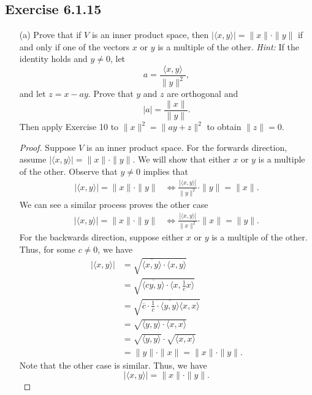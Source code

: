 \subsection*{Exercise 6.1.15} 
\begin{enumerate}
    \item[(a)] Prove that if \( V  \) is an inner product space, then \( | \langle x , y \rangle |  = \| x \| \cdot \| y \| \) if and only if one of the vectors \( x  \) or \( y  \) is a multiple of the other. \textit{Hint:} If the identity holds and \(  y \neq 0  \), let  
        \[  a = \frac{ \langle x , y \rangle }{ \|y\|^{2} },  \]
        and let \( z = x - ay  \). Prove that \( y  \) and \( z  \) are orthogonal and 
        \[  | a  |  = \frac{ \|x\| }{ \|y\| }. \]
        Then apply Exercise 10 to \( \|x\|^{2} = \|ay + z\|^{2} \) to obtain \( \|z\| = 0  \). 
    \begin{proof}
    Suppose \( V  \) is an inner product space. For the forwards direction, assume \( |  \langle  x  , y \rangle |  = \| x \| \cdot \| y\| \). We will show that either \( x  \) or \( y  \) is a multiple of the other. Observe that \( y \neq 0  \) implies that
    \begin{align*}
        | \langle x , y \rangle | = \|x\| \cdot \|y\| &\iff \frac{ | \langle x , y \rangle |  }{ \|y\|^{2} } \cdot \|y\| = \|x\|.  
    \end{align*}
    We can see a similar process proves the other case
    \begin{align*}
        | \langle x , y \rangle | = \|x\| \cdot \|y\| &\iff \frac{ | \langle x , y \rangle |  }{ \|x\|^{2} } \cdot \|x\| = \|y\|.  
    \end{align*}
    For the backwards direction, suppose either \( x  \) or \( y  \) is a multiple of the other. Thus, for some \( c \neq 0  \), we have
    \begin{align*}
        | \langle x , y \rangle |  &= \sqrt{ \overline{\langle x , y \rangle} \cdot \langle x , y \rangle }  \\
                                   &= \sqrt{ \overline{\langle cy , y \rangle} \cdot \langle x , \frac{ 1 }{ c } x  \rangle } \\
                                   &= \sqrt{ \overline{c} \cdot \frac{ 1 }{ \overline{c} } \cdot \overline{\langle y , y \rangle}  \langle x , x \rangle } \\
                                   &= \sqrt{ \langle y , y \rangle \cdot \langle x , x \rangle }  \\
                                   &=  \sqrt{ \langle y , y \rangle } \cdot \sqrt{ \langle x , x \rangle } \\
                                   &= \|y\| \cdot \|x\| = \|x\| \cdot \|y\|.
    \end{align*}
    Note that the other case is similar. Thus, we have
    \[  | \langle x , y \rangle | = \|x\| \cdot \|y\|. \]


\end{proof}
\end{enumerate}
